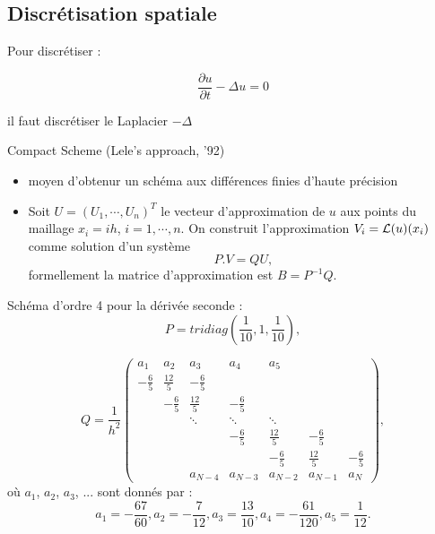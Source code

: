 \documentclass[11pt]{beamer}
\begin{document}
\subsection{Discrétisation spatiale}
\begin{frame}{}
Pour discrétiser :

$$\dfrac{\partial u}{\partial t} - \Delta u = 0$$

il faut discrétiser le Laplacier $-\Delta$

\end{frame}

\begin{frame}
 \begin{block}{Compact Scheme (Lele's approach, '92)}
 \begin{itemize}
 \item moyen d'obtenur un schéma aux différences finies d'haute précision
 \item Soit $U=(U_1,\cdots,U_n)^T$ le vecteur d'approximation de $u$ aux points du maillage $x_i=ih$, $i=1,\cdots, n$.  On construit l'approximation $V_i={\cal L}(u)(x_i)$ comme solution d'un système
$$
P . V= Q U,
$$
formellement la matrice d'approximation est $B=P^{-1}Q$.
\end{itemize}
 \end{block}
 \end{frame}
 \begin{frame}

Schéma d'ordre 4 pour la dérivée seconde :
$$ P= tridiag(\frac{1}{10},1,\frac{1}{10}),$$

$$ Q = \frac{1}{h^2} \begin{pmatrix}
a_1 & a_2 & a_3 & a_4 & a_5 &   &   \\ 
-\frac{6}{5} & \frac{12}{5} & -\frac{6}{5} &   &   &   &   \\ 
  & -\frac{6}{5} & \frac{12}{5} & -\frac{6}{5} &   &   &   \\ 
  &   & \ddots & \ddots & \ddots &   &   \\ 
  &   &   & -\frac{6}{5} & \frac{12}{5} & -\frac{6}{5} &   \\ 
  &   &   &   & -\frac{6}{5} & \frac{12}{5} & -\frac{6}{5} \\ 
  &   & a_{N-4} & a_{N-3} & a_{N-2} & a_{N-1} & a_N
\end{pmatrix}, $$
où  $a_1$, $a_2$, $a_3$, ... sont donnés par :
$$ 
a_1=-\frac{67}{60},   
a_2=-\frac{7}{12},   
a_3=\frac{13}{10},   
a_4=-\frac{61}{120},   
a_5=\frac{1}{12}.   
 $$

 \end{frame}
 
\end{document}
